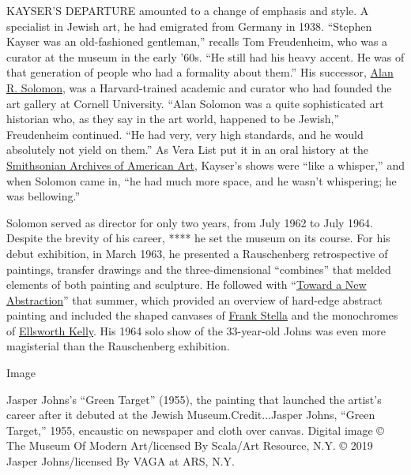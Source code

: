 KAYSER'S DEPARTURE amounted to a change of emphasis and style. A
specialist in Jewish art, he had emigrated from Germany in 1938.
``Stephen Kayser was an old-fashioned gentleman,'' recalls Tom
Freudenheim, who was a curator at the museum in the early '60s. ``He
still had his heavy accent. He was of that generation of people who had
a formality about them.'' His successor,
\href{https://www.nytimes3xbfgragh.onion/1970/03/01/archives/alan-r-solomon-19201970.html}{Alan
R. Solomon}, was a Harvard-trained academic and curator who had founded
the art gallery at Cornell University. ``Alan Solomon was a quite
sophisticated art historian who, as they say in the art world, happened
to be Jewish,'' Freudenheim continued. ``He had very, very high
standards, and he would absolutely not yield on them.'' As Vera List put
it in an oral history at the \href{https://www.aaa.si.edu/}{Smithsonian
Archives of American Art}, Kayser's shows were ``like a whisper,'' and
when Solomon came in, ``he had much more space, and he wasn't
whispering; he was bellowing.''

Solomon served as director for only two years, from July 1962 to July
1964. Despite the brevity of his career, **** he set the museum on its
course. For his debut exhibition, in March 1963, he presented a
Rauschenberg retrospective of paintings, transfer drawings and the
three-dimensional ``combines'' that melded elements of both painting and
sculpture. He followed with
``\href{https://www.amazon.com/Toward-Abstraction-Heller-Steinberg-Solomon/dp/B000PSXR2A}{Toward
a New Abstraction}'' that summer, which provided an overview of
hard-edge abstract painting and included the shaped canvases of
\href{https://www.nytimes3xbfgragh.onion/2020/03/18/t-magazine/frank-stella.html}{Frank
Stella} and the monochromes of
\href{https://www.nytimes3xbfgragh.onion/2018/02/08/t-magazine/ellsworth-kelly-austin-last-work.html}{Ellsworth
Kelly}. His 1964 solo show of the 33-year-old Johns was even more
magisterial than the Rauschenberg exhibition.

Image

Jasper Johns's ``Green Target'' (1955), the painting that launched the
artist's career after it debuted at the Jewish Museum.Credit...Jasper
Johns, ``Green Target,'' 1955, encaustic on newspaper and cloth over
canvas. Digital image © The Museum Of Modern Art/licensed By Scala/Art
Resource, N.Y. © 2019 Jasper Johns/licensed By VAGA at ARS, N.Y.

